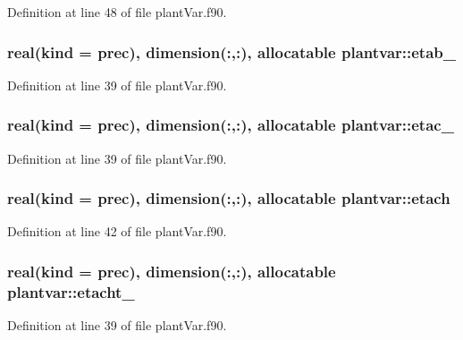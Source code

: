 Definition at line 48 of file plant\-Var.\-f90.

\hypertarget{classplantvar_a4307773fae45ef7c05c590189ae40c32}{
\subsubsection[{etab\-\_\-}]{\setlength{\rightskip}{0pt plus 5cm}real(kind = prec), dimension(\-:,\-:), allocatable plantvar\-::etab\-\_\-}}\label{classplantvar_a4307773fae45ef7c05c590189ae40c32}


Definition at line 39 of file plant\-Var.\-f90.

\hypertarget{classplantvar_ab3e228857f49d79572bc7071e650ae33}{
\subsubsection[{etac\-\_\-}]{\setlength{\rightskip}{0pt plus 5cm}real(kind = prec), dimension(\-:,\-:), allocatable plantvar\-::etac\-\_\-}}\label{classplantvar_ab3e228857f49d79572bc7071e650ae33}


Definition at line 39 of file plant\-Var.\-f90.

\hypertarget{classplantvar_a1bae392336fb8d7f0376c7e98163003e}{
\subsubsection[{etach}]{\setlength{\rightskip}{0pt plus 5cm}real(kind = prec), dimension(\-:,\-:), allocatable plantvar\-::etach}}\label{classplantvar_a1bae392336fb8d7f0376c7e98163003e}


Definition at line 42 of file plant\-Var.\-f90.

\hypertarget{classplantvar_a1bfe35beb70f107ed930740d7ce7189a}{
\subsubsection[{etacht\-\_\-}]{\setlength{\rightskip}{0pt plus 5cm}real(kind = prec), dimension(\-:,\-:), allocatable plantvar\-::etacht\-\_\-}}\label{classplantvar_a1bfe35beb70f107ed930740d7ce7189a}


Definition at line 39 of file plant\-Var.\-f90.

